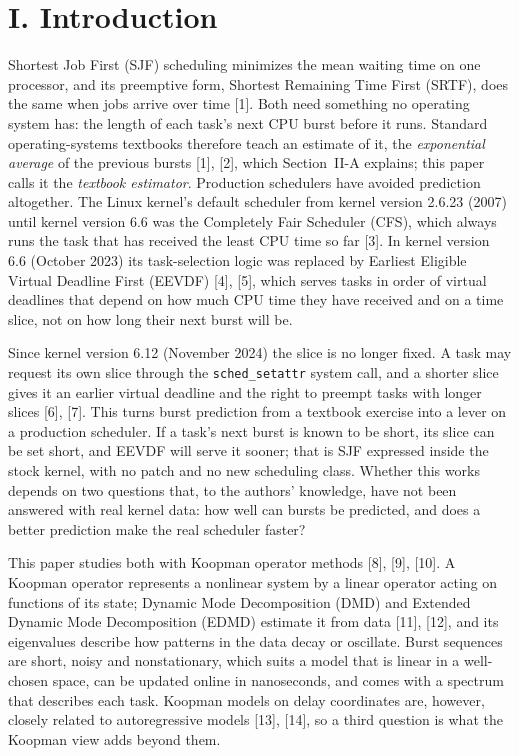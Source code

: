 \documentclass{article}
\begin{document}
\section*{I. Introduction}
Shortest Job First (SJF) scheduling minimizes the mean waiting time on one processor, and its preemptive form, Shortest Remaining Time First (SRTF), does the same when jobs arrive over time [1]. Both need something no operating system has: the length of each task's next CPU burst before it runs. Standard operating-systems textbooks therefore teach an estimate of it, the \emph{exponential average} of the previous bursts [1], [2], which Section~II-A explains; this paper calls it the \emph{textbook estimator}. Production schedulers have avoided prediction altogether. The Linux kernel's default scheduler from kernel version 2.6.23 (2007) until kernel version 6.6 was the Completely Fair Scheduler (CFS), which always runs the task that has received the least CPU time so far [3]. In kernel version 6.6 (October 2023) its task-selection logic was replaced by Earliest Eligible Virtual Deadline First (EEVDF) [4], [5], which serves tasks in order of virtual deadlines that depend on how much CPU time they have received and on a time slice, not on how long their next burst will be.

Since kernel version 6.12 (November 2024) the slice is no longer fixed. A task may request its own slice through the \texttt{sched\_setattr} system call, and a shorter slice gives it an earlier virtual deadline and the right to preempt tasks with longer slices [6], [7]. This turns burst prediction from a textbook exercise into a lever on a production scheduler. If a task's next burst is known to be short, its slice can be set short, and EEVDF will serve it sooner; that is SJF expressed inside the stock kernel, with no patch and no new scheduling class. Whether this works depends on two questions that, to the authors' knowledge, have not been answered with real kernel data: how well can bursts be predicted, and does a better prediction make the real scheduler faster?

This paper studies both with Koopman operator methods [8], [9], [10]. A Koopman operator represents a nonlinear system by a linear operator acting on functions of its state; Dynamic Mode Decomposition (DMD) and Extended Dynamic Mode Decomposition (EDMD) estimate it from data [11], [12], and its eigenvalues describe how patterns in the data decay or oscillate. Burst sequences are short, noisy and nonstationary, which suits a model that is linear in a well-chosen space, can be updated online in nanoseconds, and comes with a spectrum that describes each task. Koopman models on delay coordinates are, however, closely related to autoregressive models [13], [14], so a third question is what the Koopman view adds beyond them.
\end{document}
